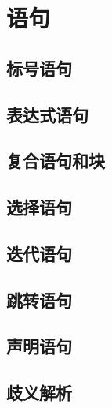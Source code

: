 
\chapter{语句}

\section{标号语句}
\section{表达式语句}
\section{复合语句和块}
\section{选择语句}
\section{迭代语句}
\section{跳转语句}
\section{声明语句}
\section{歧义解析}
